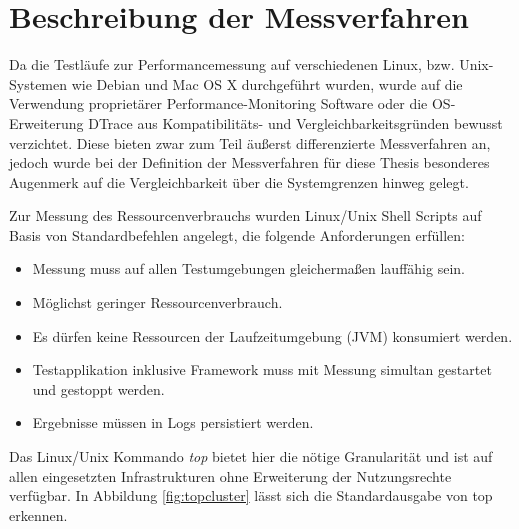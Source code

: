\section{Beschreibung der Messverfahren}
\label{section:messumgebungen}

Da die Testläufe zur Performancemessung auf verschiedenen Linux, bzw. Unix-Systemen wie Debian und Mac OS X durchgeführt wurden, wurde auf die Verwendung proprietärer Performance-Monitoring Software oder die OS-Erweiterung DTrace  aus Kompatibilitäts- und Vergleichbarkeitsgründen bewusst verzichtet. Diese bieten zwar zum Teil äußerst differenzierte Messverfahren an, jedoch wurde bei der Definition der Messverfahren für diese Thesis besonderes Augenmerk auf die Vergleichbarkeit über die Systemgrenzen hinweg gelegt. 

Zur Messung des Ressourcenverbrauchs wurden Linux/Unix Shell Scripts auf Basis von Standardbefehlen angelegt, die folgende Anforderungen erfüllen:

\begin{itemize}
\item Messung muss auf allen Testumgebungen gleichermaßen lauffähig sein.
\item Möglichst geringer Ressourcenverbrauch.
\item Es dürfen keine Ressourcen der Laufzeitumgebung (JVM) konsumiert werden.
\item Testapplikation inklusive Framework muss mit Messung simultan gestartet und gestoppt werden.
\item Ergebnisse müssen in Logs persistiert werden.
\end{itemize}

Das Linux/Unix Kommando \textit{top}  bietet hier die nötige Granularität und ist auf allen eingesetzten Infrastrukturen ohne Erweiterung der Nutzungsrechte verfügbar. In Abbildung \ref{fig:topcluster} lässt sich die Standardausgabe von top erkennen. 

   

